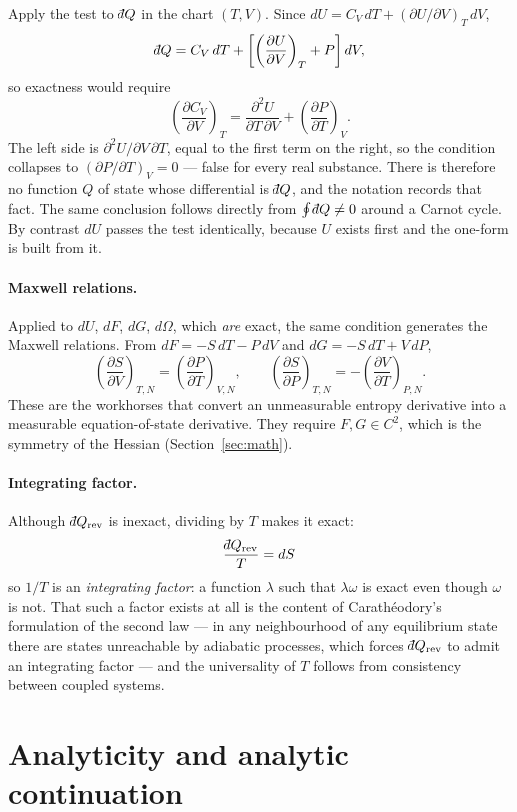 \documentclass[10pt,a4paper]{article}
\theoremstyle{remark}
\newcommand{\dbar}{\mathchar'26\mkern-11mu d}
\begin{document}
Apply the test to $\dbar Q$ in the chart $(T,V)$. Since
$dU=C_V\,dT+(\partial U/\partial V)_T\,dV$,
\[
\dbar Q=C_V\,dT+\left[\left(\frac{\partial U}{\partial V}\right)_T+P\right]dV ,
\]
so exactness would require
\[
\left(\frac{\partial C_V}{\partial V}\right)_T
=\frac{\partial^{2}U}{\partial T\,\partial V}
+\left(\frac{\partial P}{\partial T}\right)_V .
\]
The left side is $\partial^{2}U/\partial V\,\partial T$, equal to the first term
on the right, so the condition collapses to $(\partial P/\partial T)_V=0$ --- false
for every real substance. There is therefore no function $Q$ of state whose
differential is $\dbar Q$, and the notation records that fact. The same
conclusion follows directly from $\oint\dbar Q\neq0$ around a Carnot cycle. By
contrast $dU$ passes the test identically, because $U$ exists first and the
one-form is built from it.

\paragraph{Maxwell relations.} Applied to $dU$, $dF$, $dG$, $d\Omega$, which
\emph{are} exact, the same condition generates the Maxwell relations. From
$dF=-S\,dT-P\,dV$ and $dG=-S\,dT+V\,dP$,
\[
\left(\frac{\partial S}{\partial V}\right)_{T,N}
=\left(\frac{\partial P}{\partial T}\right)_{V,N},
\qquad
\left(\frac{\partial S}{\partial P}\right)_{T,N}
=-\left(\frac{\partial V}{\partial T}\right)_{P,N}.
\]
These are the workhorses that convert an unmeasurable entropy derivative into a
measurable equation-of-state derivative. They require $F,G\in C^{2}$, which is
the symmetry of the Hessian (Section~\ref{sec:math}).

\paragraph{Integrating factor.} Although $\dbar Q_{\rm rev}$ is inexact, dividing
by $T$ makes it exact:
\[
\;\frac{\dbar Q_{\rm rev}}{T}=dS\
\]
so $1/T$ is an \emph{integrating factor}: a function $\lambda$ such that
$\lambda\omega$ is exact even though $\omega$ is not. That such a factor exists
at all is the content of Carath\'eodory's formulation of the second law --- in
any neighbourhood of any equilibrium state there are states unreachable by
adiabatic processes, which forces $\dbar Q_{\rm rev}$ to admit an integrating
factor --- and the universality of $T$ follows from consistency between coupled
systems.


\section{Analyticity and analytic continuation}
\label{app:analytic}
\end{document}
